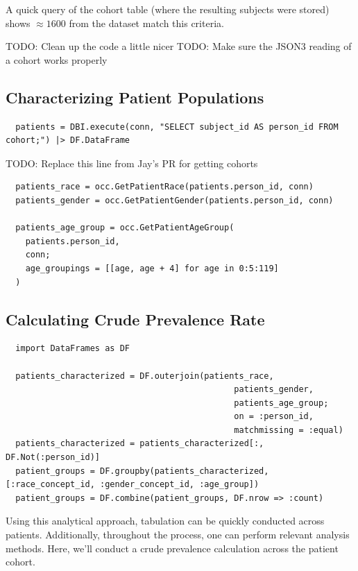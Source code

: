 \documentclass{juliacon}
\begin{document}
A quick query of the cohort table (where the resulting subjects were stored) shows $\approx 1600$ from the dataset match this criteria.

TODO: Clean up the code a little nicer
TODO: Make sure the JSON3 reading of a cohort works properly

\subsection{Characterizing Patient Populations}

\begin{verbatim}
  patients = DBI.execute(conn, "SELECT subject_id AS person_id FROM cohort;") |> DF.DataFrame
\end{verbatim}

TODO: Replace this line from Jay's PR for getting cohorts

\begin{verbatim}
  patients_race = occ.GetPatientRace(patients.person_id, conn)
  patients_gender = occ.GetPatientGender(patients.person_id, conn)

  patients_age_group = occ.GetPatientAgeGroup(
    patients.person_id, 
    conn; 
    age_groupings = [[age, age + 4] for age in 0:5:119]
  )
\end{verbatim}

\subsection{Calculating Crude Prevalence Rate}

\begin{verbatim}
  import DataFrames as DF

  patients_characterized = DF.outerjoin(patients_race,
                                              patients_gender,
                                              patients_age_group;
                                              on = :person_id, 
                                              matchmissing = :equal)
  patients_characterized = patients_characterized[:, DF.Not(:person_id)]
  patient_groups = DF.groupby(patients_characterized, [:race_concept_id, :gender_concept_id, :age_group])
  patient_groups = DF.combine(patient_groups, DF.nrow => :count)
\end{verbatim}

Using this analytical approach, tabulation can be quickly conducted across patients.
Additionally, throughout the process, one can perform relevant analysis methods.
Here, we'll conduct a crude prevalence calculation across the patient cohort.
\end{document}
